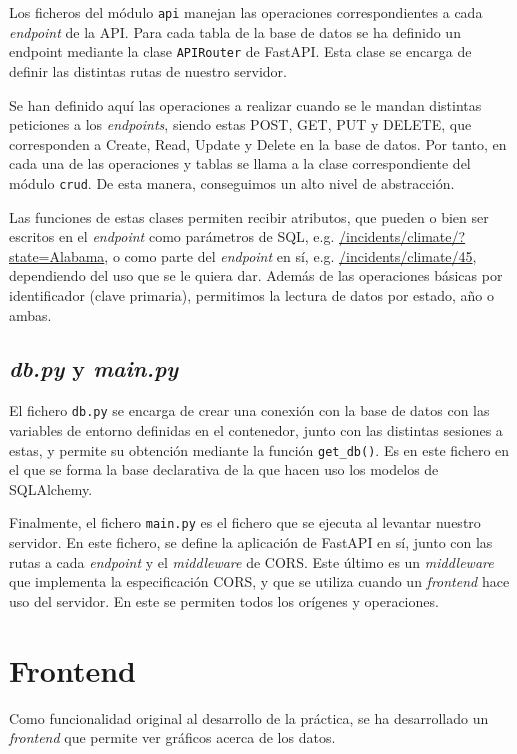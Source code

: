 \documentclass[11pt,a4paper]{article}
\begin{document}
Los ficheros del módulo \lstinline!api! manejan las operaciones correspondientes a cada \textit{endpoint} de la API. Para cada tabla de la base de datos se ha definido un endpoint mediante la clase \lstinline!APIRouter! de FastAPI. Esta clase se encarga de definir las distintas rutas de nuestro servidor.

Se han definido aquí las operaciones a realizar cuando se le mandan distintas peticiones a los \textit{endpoints}, siendo estas POST, GET, PUT y DELETE, que corresponden a Create, Read, Update y Delete en la base de datos. Por tanto, en cada una de las operaciones y tablas se llama a la clase correspondiente del módulo \lstinline!crud!. De esta manera, conseguimos un alto nivel de abstracción.

Las funciones de estas clases permiten recibir atributos, que pueden o bien ser escritos en el \textit{endpoint} como parámetros de SQL, e.g. \url{/incidents/climate/?state=Alabama}, o como parte del \textit{endpoint} en sí, e.g. \url{/incidents/climate/45}, dependiendo del uso que se le quiera dar. Además de las operaciones básicas por identificador (clave primaria), permitimos la lectura de datos por estado, año o ambas.

\subsection*{\textit{db.py} y \textit{main.py}}

El fichero \lstinline!db.py! se encarga de crear una conexión con la base de datos con las variables de entorno definidas en el contenedor, junto con las distintas sesiones a estas, y permite su obtención mediante la función \lstinline!get_db()!. Es en este fichero en el que se forma la base declarativa de la que hacen uso los modelos de SQLAlchemy.

Finalmente, el fichero \lstinline!main.py! es el fichero que se ejecuta al levantar nuestro servidor. En este fichero, se define la aplicación de FastAPI en sí, junto con las rutas a cada \textit{endpoint} y el \textit{middleware} de CORS. Este último es un \textit{middleware} que implementa la especificación CORS, y que se utiliza cuando un \textit{frontend} hace uso del servidor. En este se permiten todos los orígenes y operaciones.

\section{Frontend}

Como funcionalidad original al desarrollo de la práctica, se ha desarrollado un \textit{frontend} que permite ver gráficos acerca de los datos.
\end{document}
